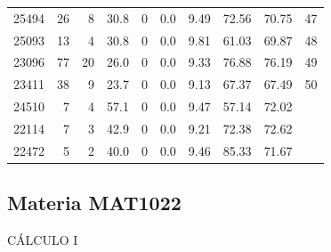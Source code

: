 \begin{longtable}{lrrrrrrrrr}
25494 & 26 & 8 & 30.8 & 0 & 0.0 & 9.49 & 72.56 & 70.75 & 47 \\
25093 & 13 & 4 & 30.8 & 0 & 0.0 & 9.81 & 61.03 & 69.87 & 48 \\
23096 & 77 & 20 & 26.0 & 0 & 0.0 & 9.33 & 76.88 & 76.19 & 49 \\
23411 & 38 & 9 & 23.7 & 0 & 0.0 & 9.13 & 67.37 & 67.49 & 50 \\
24510 & 7 & 4 & 57.1 & 0 & 0.0 & 9.47 & 57.14 & 72.02 &  \\
22114 & 7 & 3 & 42.9 & 0 & 0.0 & 9.21 & 72.38 & 72.62 &  \\
22472 & 5 & 2 & 40.0 & 0 & 0.0 & 9.46 & 85.33 & 71.67 &  \\
\bottomrule
\end{longtable}
\endgroup

\subsection{Materia MAT1022}

CÁLCULO I

